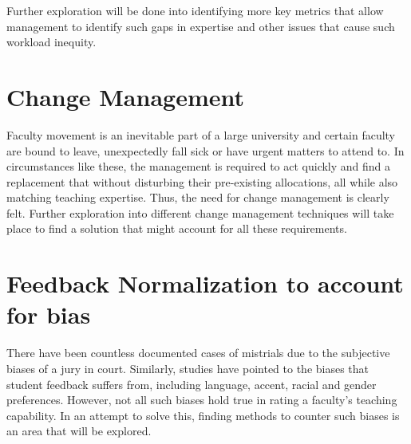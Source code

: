 Further exploration will be done into identifying more key metrics that allow management to identify such gaps in expertise and other issues that cause such workload inequity.

\section{Change Management}
Faculty movement is an inevitable part of a large university and certain faculty are bound to leave, unexpectedly fall sick or have urgent matters to attend to. In circumstances like these, the management is required to act quickly and find a replacement that without disturbing their pre-existing allocations, all while also matching teaching expertise. Thus, the need for change management is clearly felt.
Further exploration into different change management techniques will take place to find a solution that might account for all these requirements.


\section{Feedback Normalization to account for bias}

There have been countless documented cases of mistrials due to the subjective biases of a jury in court. Similarly, studies have pointed to the biases that student feedback suffers from, including language, accent, racial and gender preferences. However, not all such biases hold true in rating a faculty's teaching capability. In an attempt to solve this, finding methods to counter such biases is an area that will be explored.
